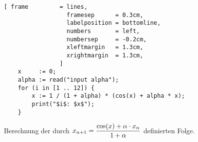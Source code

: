 \begin{figure}[!ht]
  \centering
\begin{Verbatim}[ frame         = lines, 
                  framesep      = 0.3cm, 
                  labelposition = bottomline,
                  numbers       = left,
                  numbersep     = -0.2cm,
                  xleftmargin   = 1.3cm,
                  xrightmargin  = 1.3cm,
                ]
    x     := 0;
    alpha := read("input alpha");
    for (i in [1 .. 12]) {
        x := 1 / (1 + alpha) * (cos(x) + alpha * x);
        print("$i$: $x$");
    }
\end{Verbatim}
\vspace*{-0.3cm}
  \caption{Berechnung der durch $\displaystyle x_{n+1} = \frac{\cos(x) + \alpha \cdot  x_n}{1 + \alpha}$ definierten
    Folge.}
  \label{fig:cosXisX.stlx}
\end{figure} %


\begin{table}[!h]
  \centering
{}
  \caption{Die ersten 12 Glieder der durch $x_{n+1} = \frac{\cos(x) + \alpha \cdot  x_n}{1 + \alpha}$ definierten
    Folge f\"ur $\alpha = 0.7$.}
  \label{tab:alpha-x-cos-x}
\end{table}

